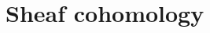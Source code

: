 \documentclass[../../main]{subfiles}
\begin{document}
\part{Sheaf cohomology}\label{part:sheaf-cohomology}




\end{document}
